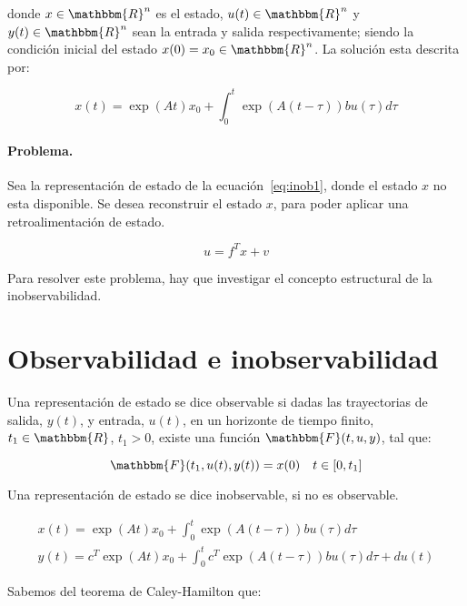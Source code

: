 	donde $x \in \mathbbm{R}^n$ es el estado, $u(t) \in \mathbbm{R}^n$ y $y(t) \in \mathbbm{R}^n$ sean la entrada y salida respectivamente; siendo la condición inicial del estado $x(0) = x_0 \in \mathbbm{R}^n$. La solución esta descrita por:

	\begin{equation*}
		x(t) = \exp{(At)} x_0 + \int_0^t \exp{\left(A(t - \tau)\right)} b u(\tau) d\tau
	\end{equation*}

	\paragraph{Problema.}

	Sea la representación de estado de la ecuación~\ref{eq:inob1}, donde el estado $x$ no esta disponible. Se desea reconstruir el estado $x$, para poder aplicar una retroalimentación de estado.

	\begin{equation}
		u = f^T x + v
	\end{equation}

	Para resolver este problema, hay que investigar el concepto estructural de la inobservabilidad.

	\newpage
    \section{Observabilidad e inobservabilidad}

    Una representación de estado se dice observable si dadas las trayectorias de salida, $y(t)$, y entrada, $u(t)$, en un horizonte de tiempo finito, $t_1 \in \mathbbm{R}$, $t_1 > 0$, existe una función $\mathbbm{F}(t, u, y)$, tal que:

    \begin{equation}
    	\mathbbm{F}(t_1, u(t), y(t)) = x(0) \quad t \in [0, t_1]
    \end{equation}

    Una representación de estado se dice inobservable, si no es observable.

    \begin{eqnarray} \label{eq:inob2}
		x(t) = \exp{(At)} x_0 + \int_0^t \exp{\left(A(t - \tau)\right)} b u(\tau) d\tau \nonumber \\
		y(t) = c^T \exp{(At)} x_0 + \int_0^t c^T \exp{\left(A(t - \tau)\right)} b u(\tau) d\tau +d u(t)
	\end{eqnarray}

	Sabemos del teorema de Caley-Hamilton que:

